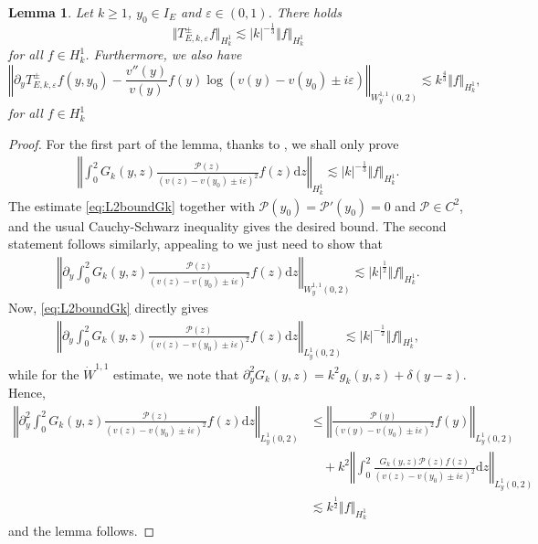 \documentclass[11pt,reqno]{amsproc}
\newtheorem{lemma}[proposition]{Lemma}
\theoremstyle{definition}
\numberwithin{equation}{section}
\renewcommand{\d}{\mathrm{d}}
\newcommand{\ep}{\varepsilon}
\renewcommand{\P}{{\mathcal{P}}}
\begin{document}
\begin{lemma}\label{lemma:TEmapsH1ktoH1k}
Let $k\geq 1$, $y_0\in I_E$  and $\ep\in (0,1)$. There holds
\begin{equation}\label{eq:H1boundTkyep}
\Vert T_{E,k,\ep}^\pm f \Vert_{H_k^1} \lesssim |k|^{-\frac13}\Vert f \Vert_{H_k^1}
\end{equation}
for all $f\in H_k^1$. Furthermore, we also have
\begin{equation}\label{eq:pyTEboundW11}
\left\Vert \partial_y T_{E,k,\ep}^\pm f(y,y_0)  - \frac{v''(y)}{v(y)}f(y)\log(v(y) - v(y_0) \pm i\ep) \right\Vert_{W_y^{1,1}(0,2)} \lesssim k^\frac43\Vert f \Vert_{H_k^1},
\end{equation}
for all $f\in H_k^1$
\end{lemma}

\begin{proof}
For the first part of the lemma, thanks to  \cite[Lemma 3.1]{JiaGev20}, we shall only prove
\begin{align*}
\left \Vert \int_0^2 G_k(y,z)  \frac{\P(z)}{(v(z) - v(y_0) \pm i\ep)^2} f(z) \d z \right\Vert_{H_k^1}\lesssim |k|^{-\frac13}\Vert f \Vert_{H_k^1}.
\end{align*}
The estimate \eqref{eq:L2boundGk} together with $\P(y_0) = \P'(y_0)=0$ and $\P\in C^2$, and the usual Cauchy-Schwarz inequality gives the desired bound. The second statement follows similarly, appealing to  \cite[Lemma 3.1]{JiaGev20} we just need to show that 
\begin{align*}
\left \Vert \partial_y \int_0^2 G_k(y,z)  \frac{\P(z)}{(v(z) - v(y_0) \pm i\ep)^2} f(z) \d z \right\Vert_{W_y^{1,1}(0,2)}\lesssim |k|^{\frac12}\Vert f \Vert_{H_k^1}.
\end{align*}
Now, \eqref{eq:L2boundGk} directly gives 
\begin{align*}
\left \Vert \partial_y \int_0^2 G_k(y,z)  \frac{\P(z)}{(v(z) - v(y_0) \pm i\ep)^2} f(z) \d z \right\Vert_{L^1_y(0,2)}\lesssim |k|^{-\frac12}\Vert f \Vert_{H_k^1},
\end{align*}
while for the $\dot{W}^{1,1}$ estimate, we note that $\partial_y^2 G_k(y,z) = k^2g_k(y,z) + \delta(y-z)$. Hence,
\begin{align*}
\left \Vert \partial^2_y \int_0^2 G_k(y,z)  \frac{\P(z)}{(v(z) - v(y_0) \pm i\ep)^2} f(z) \d z \right\Vert_{L^1_y(0,2)} &\leq \left \Vert \frac{\P(y)}{(v(y) - v(y_0) \pm i\ep)^2}f(y) \right\Vert_{L^1_y(0,2)} \\
&\quad + k^2 \left \Vert \int_0^2  \frac{G_k(y,z) \P(z)f(z)}{(v(z) - v(y_0) \pm i\ep)^2}  \d z \right\Vert_{L^1_y(0,2)} \\
&\lesssim k^\frac12\Vert f \Vert_{H_k^1}
\end{align*}
and the lemma follows.
\end{proof}
\end{document}
